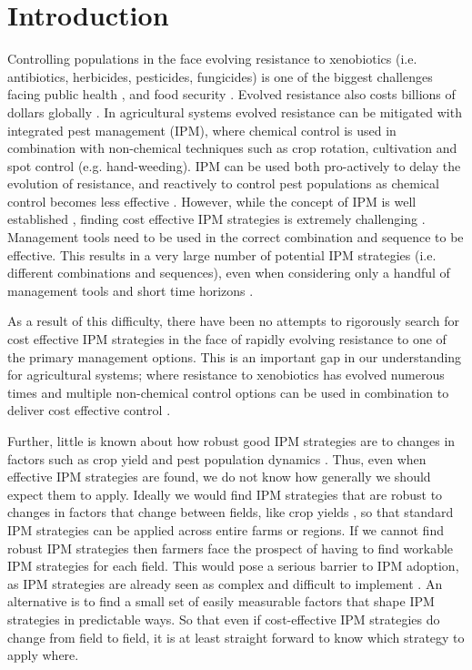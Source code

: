 \documentclass[12pt, a4paper]{article}
\begin{document}
\section*{Introduction}
Controlling populations in the face evolving resistance to xenobiotics (i.e. antibiotics, herbicides, pesticides, fungicides) is one of the biggest challenges facing public health \citep{Laxm2016, Willy2017}, and food security \citep{Denh1992, Palu2001, Hick2018}. Evolved resistance also costs billions of dollars globally \citep{Livi2016, Ches2018, Hick2018}. In agricultural systems evolved resistance can be mitigated with integrated pest management (IPM), where chemical control is used in combination with non-chemical techniques such as crop rotation, cultivation and spot control (e.g. hand-weeding). IPM can be used both pro-actively to delay the evolution of resistance, and reactively to control pest populations as chemical control becomes less effective \citep{Denh1992, Hick2018}. However, while the concept of IPM is well established \citep{Bott1979}, finding cost effective IPM strategies is extremely challenging \citep{Dana2014, Chal2015}. Management tools need to be used in the correct combination and sequence to be effective. This results in a very large number of potential IPM strategies (i.e. different combinations and sequences), even when considering only a handful of management tools and short time horizons \citep{Chal2015}. 

As a result of this difficulty, there have been no attempts to rigorously search for cost effective IPM strategies in the face of rapidly evolving resistance to one of the primary management options. This is an important gap in our understanding for agricultural systems; where resistance to xenobiotics has evolved numerous times \citep{Denh1992, Palu2001} and multiple non-chemical control options can be used in combination to deliver cost effective control \citep{Chal2015}.      

Further, little is known about how robust good IPM strategies are to changes in factors such as crop yield and pest population dynamics \citep{EpanN2010}. Thus, even when effective IPM strategies are found, we do not know how generally we should expect them to apply. Ideally we would find IPM strategies that are robust to changes in factors that change between fields, like crop yields \citep{Swin1994, Hick2018}, so that standard IPM strategies can be applied across entire farms or regions. If we cannot find robust IPM strategies then farmers face the prospect of having to find workable IPM strategies for each field. This would pose a serious barrier to IPM adoption, as IPM strategies are already seen as complex and difficult to implement \citep{Llew2006}. An alternative is to find a small set of easily measurable factors that shape IPM strategies in predictable ways. So that even if cost-effective IPM strategies do change from field to field, it is at least straight forward to know which strategy to apply where.     
\end{document}
